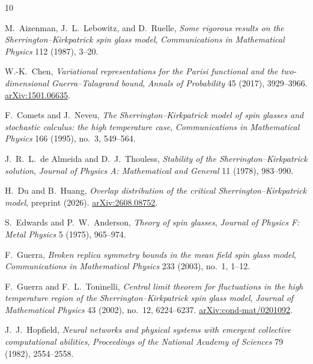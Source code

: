 \documentclass[11pt]{article}
\numberwithin{equation}{section}
\newcommand{\1}{\mathbf 1}
\begin{document}
\begin{thebibliography}{10}

M.~Aizenman, J.~L.~Lebowitz, and D.~Ruelle,
\newblock
\emph{Some rigorous results on the Sherrington--Kirkpatrick spin glass model},
\newblock \emph{Communications in Mathematical Physics} 112 (1987), 3--20.



W.-K.~Chen,
\newblock
\emph{Variational representations for the Parisi functional and the
two-dimensional Guerra--Talagrand bound},
\newblock \emph{Annals of Probability} 45 (2017), 3929--3966.
\href{https://arxiv.org/abs/1501.06635}{arXiv:1501.06635}.

F.~Comets and J.~Neveu,
\newblock
\emph{The Sherrington--Kirkpatrick model of spin glasses and stochastic
calculus: the high temperature case},
\newblock \emph{Communications in Mathematical Physics} 166 (1995), no.~3,
549--564.

J.~R.~L.~de Almeida and D.~J.~Thouless,
\newblock
\emph{Stability of the Sherrington--Kirkpatrick solution},
\newblock \emph{Journal of Physics A: Mathematical and General} 11 (1978),
983--990.

H.~Du and B.~Huang,
\newblock
\emph{Overlap distribution of the critical Sherrington--Kirkpatrick model},
\newblock preprint (2026).
\href{https://arxiv.org/abs/2608.08752}{arXiv:2608.08752}.


S.~Edwards and P.~W.~Anderson,
\newblock
\emph{Theory of spin glasses},
\newblock \emph{Journal of Physics F: Metal Physics} 5 (1975), 965--974.

F.~Guerra,
\newblock
\emph{Broken replica symmetry bounds in the mean field spin glass model},
\newblock \emph{Communications in Mathematical Physics} 233 (2003),
no.~1, 1--12.

F.~Guerra and F.~L.~Toninelli,
\newblock
\emph{Central limit theorem for fluctuations in the high temperature region
of the Sherrington--Kirkpatrick spin glass model},
\newblock \emph{Journal of Mathematical Physics} 43 (2002), no.~12,
6224--6237.
\href{https://arxiv.org/abs/cond-mat/0201092}{arXiv:cond-mat/0201092}.

J.~J.~Hopfield,
\newblock
\emph{Neural networks and physical systems with emergent collective
computational abilities},
\newblock \emph{Proceedings of the National Academy of Sciences} 79 (1982),
2554--2558.


\end{thebibliography}
\end{document}
